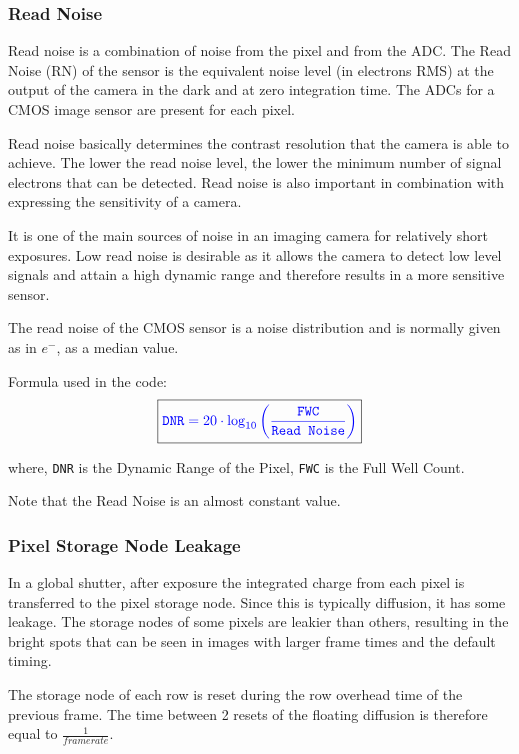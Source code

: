 
\subsubsection{Read Noise} %
Read noise is a combination of noise from the pixel and from the ADC. The Read Noise (RN) of the sensor is the equivalent noise level (in electrons RMS) at the output of the camera in the dark and at zero integration time. The ADCs for a CMOS image sensor are present for each pixel.

Read noise basically determines the contrast resolution that the camera is able to achieve. The lower the read noise level, the lower the minimum number of signal electrons that can be detected. Read noise is also important in combination with expressing the sensitivity of a camera. 

It is one of the main sources of noise in an imaging camera for relatively short exposures. Low read noise is desirable as it allows the camera to detect low level signals and attain a high dynamic range and therefore results in a more sensitive sensor.

The read noise of the CMOS sensor is a noise distribution and is normally given as in $e^-$, as a median value.

Formula used in the code:
\begin{equation}
    \boxed{ \color{blue} \texttt{DNR} = 20 \cdot \log_{10} \left(\frac{\texttt{FWC}}{\texttt{Read Noise}} \right) \color{black} }
\end{equation}

where, \texttt{DNR} is the Dynamic Range of the Pixel, \texttt{FWC} is the Full Well Count. 

Note that the Read Noise is an almost constant value.


\subsubsection{Pixel Storage Node Leakage} %

In a global shutter, after exposure the integrated charge from each pixel is transferred to the pixel storage node. Since this is typically diffusion, it has some leakage. The storage nodes of some pixels are leakier than others, resulting in the bright spots that can be seen in images with larger frame times and the default timing.

The storage node of each row is reset during the row overhead time of the previous frame. The time between 2 resets of the floating diffusion is therefore equal to $\frac{1}{frame rate}$.

